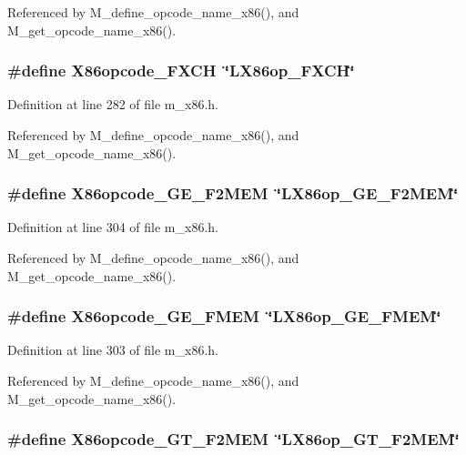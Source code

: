 Referenced by M\_\-define\_\-opcode\_\-name\_\-x86(), and M\_\-get\_\-opcode\_\-name\_\-x86().
\subsubsection{\setlength{\rightskip}{0pt plus 5cm}\#define X86opcode\_\-FXCH~\char`\"{}LX86op\_\-FXCH\char`\"{}}\label{m__x86_8h_f1bd25239ea84541047ee13aa28353e3}




Definition at line 282 of file m\_\-x86.h.

Referenced by M\_\-define\_\-opcode\_\-name\_\-x86(), and M\_\-get\_\-opcode\_\-name\_\-x86().
\subsubsection{\setlength{\rightskip}{0pt plus 5cm}\#define X86opcode\_\-GE\_\-F2MEM~\char`\"{}LX86op\_\-GE\_\-F2MEM\char`\"{}}\label{m__x86_8h_cdaa66ef449d98b48a2b2f6959836066}




Definition at line 304 of file m\_\-x86.h.

Referenced by M\_\-define\_\-opcode\_\-name\_\-x86(), and M\_\-get\_\-opcode\_\-name\_\-x86().
\subsubsection{\setlength{\rightskip}{0pt plus 5cm}\#define X86opcode\_\-GE\_\-FMEM~\char`\"{}LX86op\_\-GE\_\-FMEM\char`\"{}}\label{m__x86_8h_f88a2a4ae50a47f1b4f2fc371963cbea}




Definition at line 303 of file m\_\-x86.h.

Referenced by M\_\-define\_\-opcode\_\-name\_\-x86(), and M\_\-get\_\-opcode\_\-name\_\-x86().
\subsubsection{\setlength{\rightskip}{0pt plus 5cm}\#define X86opcode\_\-GT\_\-F2MEM~\char`\"{}LX86op\_\-GT\_\-F2MEM\char`\"{}}\label{m__x86_8h_2aefd149365f0a885630c32464321a8d}




